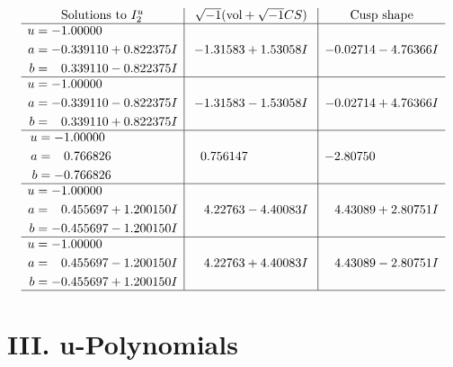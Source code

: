 \documentclass[1p]{elsarticle_modified}
\theoremstyle{definition}
\newcommand{\I}{\sqrt{-1}}
\begin{document}
$$\begin{array}{c|c|c}  
\text{Solutions to }I^u_{2}& \I (\text{vol} + \sqrt{-1}CS) & \text{Cusp shape}\\
 \hline 
\begin{aligned}
u &= -1.00000\phantom{ +0.000000I} \\
a &= -0.339110 + 0.822375 I \\
b &= \phantom{-}0.339110 - 0.822375 I\end{aligned}
 & -1.31583 + 1.53058 I & -0.02714 - 4.76366 I \\ \hline\begin{aligned}
u &= -1.00000\phantom{ +0.000000I} \\
a &= -0.339110 - 0.822375 I \\
b &= \phantom{-}0.339110 + 0.822375 I\end{aligned}
 & -1.31583 - 1.53058 I & -0.02714 + 4.76366 I \\ \hline\begin{aligned}
u &= -1.00000\phantom{ +0.000000I} \\
a &= \phantom{-}0.766826\phantom{ +0.000000I} \\
b &= -0.766826\phantom{ +0.000000I}\end{aligned}
 & \phantom{-}0.756147\phantom{ +0.000000I} & -2.80750\phantom{ +0.000000I} \\ \hline\begin{aligned}
u &= -1.00000\phantom{ +0.000000I} \\
a &= \phantom{-}0.455697 + 1.200150 I \\
b &= -0.455697 - 1.200150 I\end{aligned}
 & \phantom{-}4.22763 - 4.40083 I & \phantom{-}4.43089 + 2.80751 I \\ \hline\begin{aligned}
u &= -1.00000\phantom{ +0.000000I} \\
a &= \phantom{-}0.455697 - 1.200150 I \\
b &= -0.455697 + 1.200150 I\end{aligned}
 & \phantom{-}4.22763 + 4.40083 I & \phantom{-}4.43089 - 2.80751 I\\
 \hline 
 \end{array}$$\newpage
\newpage\renewcommand{\arraystretch}{1}
\centering \section*{ III. u-Polynomials}
\end{document}

